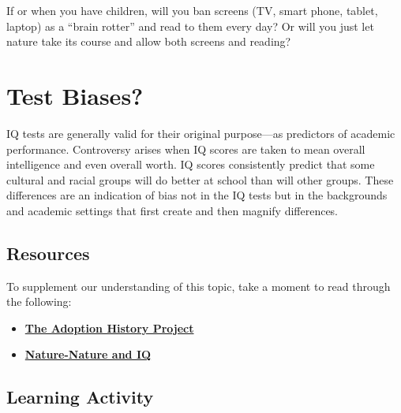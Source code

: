 \documentclass[
]{book}
\providecommand{\tightlist}{%
  \setlength{\itemsep}{0pt}\setlength{\parskip}{0pt}}
\begin{document}
If or when you have children, will you ban screens (TV, smart phone, tablet, laptop) as a ``brain rotter'' and read to them every day? Or will you just let nature take its course and allow both screens and reading?

\hypertarget{test-biases}{%
\section{Test Biases?}\label{test-biases}}

IQ tests are generally valid for their original purpose---as predictors of aca­demic performance. Controversy arises when IQ scores are taken to mean over­all intelligence and even overall worth. IQ scores consistently predict that some cultural and racial groups will do better at school than will other groups. These differ­ences are an indication of bias not in the IQ tests but in the back­grounds and academic settings that first create and then magnify differences.

\hypertarget{resources-3}{%
\subsection*{Resources}\label{resources-3}}

To supplement our understanding of this topic, take a moment to read through the following:

\begin{itemize}
\tightlist
\item
  \href{https://darkwing.uoregon.edu/~adoption/topics/naturenurturestudies.htm}{\textbf{The Adoption History Project}}\\
\item
  \href{http://unisci.com/stories/20012/0417014.htm}{\textbf{Nature-Nature and IQ}}
\end{itemize}

\hypertarget{learning-activity-4}{%
\subsection*{Learning Activity}\label{learning-activity-4}}
\end{document}
